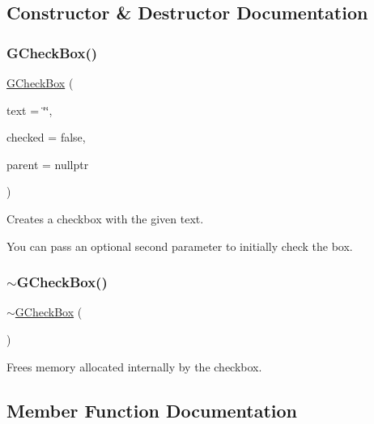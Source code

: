 \subsection{Constructor \& Destructor Documentation}
\mbox{\label{classGCheckBox_ab79c27853bb6f5b8ec3ea139ef556f25}} 
\subsubsection{\texorpdfstring{G\+Check\+Box()}{GCheckBox()}}
{\footnotesize\ttfamily \mbox{\hyperlink{classGCheckBox}{G\+Check\+Box}} (\begin{DoxyParamCaption}\item[{const std\+::string \&}]{text = {\ttfamily \char`\"{}\char`\"{}},  }\item[{bool}]{checked = {\ttfamily false},  }\item[{Q\+Widget $\ast$}]{parent = {\ttfamily nullptr} }\end{DoxyParamCaption})}



Creates a checkbox with the given text. 

You can pass an optional second parameter to initially check the box. \mbox{\label{classGCheckBox_a40853b1ff7d4f861d33054a5df7fb86d}} 
\subsubsection{\texorpdfstring{$\sim$\+G\+Check\+Box()}{~GCheckBox()}}
{\footnotesize\ttfamily $\sim$\mbox{\hyperlink{classGCheckBox}{G\+Check\+Box}} (\begin{DoxyParamCaption}{ }\end{DoxyParamCaption})\hspace{0.3cm}{\ttfamily [override]}}



Frees memory allocated internally by the checkbox. 



\subsection{Member Function Documentation}
\mbox{\label{classGInteractor_a02f20ea6edfa0671f31c4c648a253833}} 
